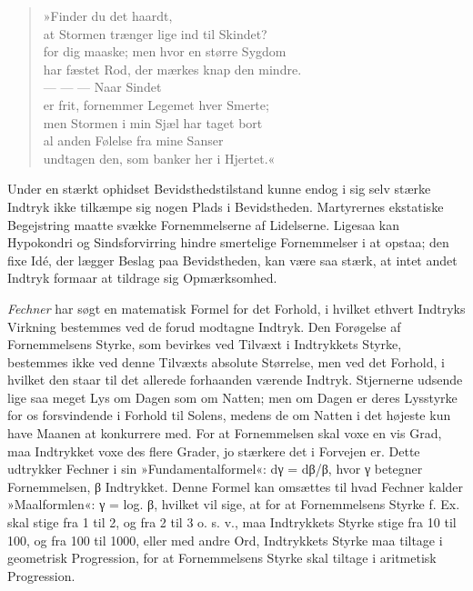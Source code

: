 \documentclass[12pt,a4paper,openany]{book}
\newcommand{\opage}[1]{\marginnote{\footnotesize\textit{[#1]}}}
\begin{document}
\begin{verse}
»Finder du det haardt,\\
at Stormen trænger lige ind til Skindet?\\
for dig maaske; men hvor en større Sygdom\\
har fæstet Rod, der mærkes knap den mindre.\\
--- --- --- Naar Sindet\\
er frit, fornemmer Legemet hver Smerte;\\
men Stormen i min Sjæl har taget bort\\
al anden Følelse fra mine Sanser\\
undtagen den, som banker her i Hjertet.«
\end{verse}

Under en stærkt ophidset Bevidsthedstilstand kunne endog i sig selv
stærke Indtryk ikke tilkæmpe sig nogen Plads i Bevidstheden. Martyrernes
ekstatiske Begejstring maatte svække Fornemmelserne af Lidelserne.
Ligesaa kan Hypokondri og Sindsforvirring hindre smertelige Fornemmelser
i at opstaa; den fixe Idé, der lægger Beslag paa Bevidstheden, kan være
saa stærk, at intet andet Indtryk formaar at tildrage sig Opmærksomhed.

\emph{Fechner} har søgt en matematisk Formel for det Forhold, i hvilket
ethvert Indtryks Virkning bestemmes ved de forud modtagne Indtryk. Den
Forøgelse af Fornemmelsens Styrke, som bevirkes ved Tilvæxt i
Indtrykkets Styrke, bestemmes ikke ved denne Tilvæxts absolute
Størrelse, men ved det Forhold, i hvilket den staar til det allerede
forhaanden værende Indtryk. Stjernerne udsende lige saa meget Lys om
Dagen som om Natten; men om Dagen er deres Lysstyrke for os forsvindende
i Forhold til Solens, medens de om Natten i det højeste kun have Maanen
at konkurrere med. For at Fornemmelsen skal voxe en vis Grad, maa
Indtrykket voxe des flere Grader, jo stærkere det i Forvejen er. Dette
udtrykker
\opage{133}Fechner i sin »Fundamentalformel«: dγ = dβ/β, hvor γ betegner
Fornemmelsen, β Indtrykket. Denne Formel kan omsættes til hvad Fechner
kalder »Maalformlen«: γ = log. β, hvilket vil sige, at for at
Fornemmelsens Styrke f. Ex. skal stige fra 1 til 2, og fra 2 til 3 o. s.
v., maa Indtrykkets Styrke stige fra 10 til 100, og fra 100 til 1000,
eller med andre Ord, Indtrykkets Styrke maa tiltage i geometrisk
Progression, for at Fornemmelsens Styrke skal tiltage i aritmetisk
Progression.
\end{document}
